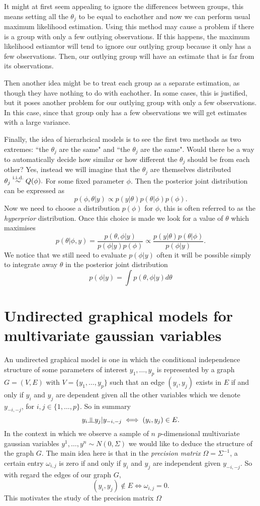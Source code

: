 \documentclass{scrartcl}
\newcommand{\iid}{\stackrel{\textmd{i.i.d.}}{\sim}}
\newcommand{\inv}{^{-1}}
\newcommand{\indep}{\rotatebox[origin=c]{90}{$\models$}}
\begin{document}
It might at first seem appealing to ignore the differences between groups, this
means setting all the $\theta_j$ to be equal to eachother and now we can
perform usual maximum likelihood estimation. Using this method may cause a
problem if there is a group with only a few outlying observations. If this
happens, the maximum likelihood estiamtor will tend to ignore our outlying
group because it only has a few observations. Then, our outlying group will
have an estimate that is far from its observations.

Then another idea might be to treat each group as a separate estimation, as
though they have nothing to do with eachother. In some cases, this is
justified, but it poses another problem for our outlying group with only a few
observations. In this case, since that group only has a few observations we
will get estimates with a large variance.

Finally, the idea of hierarhcical models is to see the first two methods as two
extremes: ``the $\theta_j$ are the same" and ``the $\theta_j$ are the same".
Would there be a way to automatically decide how similar or how different the $\theta_j$ should be from each other?
Yes, instead we will imagine that the $\theta_j$ are themselves distributed
$\theta_j \iid Q(\phi).$ For some fixed parameter $\phi.$ Then the posterior
joint distribution can be expressed as
\[p(\phi, \theta | y) \propto p(y | \theta) p(\theta | \phi) p(\phi).\]
Now we need to choose a distribution $p(\phi)$ for $\phi$, this is often
referred to as the \emph{hyperprior} distribution. Once this choice is made we
look for a value of $\theta$ which maximises \[p(\theta | \phi, y) =
	\frac{p(\theta, \phi | y)}{p(\phi | y) p(\phi)} \propto \frac{p(y | \theta)
		p(\theta | \phi)}{p(\phi | y)}.\]
We notice that we still need to evaluate $p(\phi | y)$ often it will be
possible simply to integrate away $\theta$ in the posterior joint distribution
\[p(\phi | y) = \int p(\theta, \phi | y) d\theta\]

\section{Undirected graphical models for multivariate gaussian
  variables}\label{sect:graphs}
An undirected graphical model is one in which the conditional independence
structure of some parameters of interest $y_1, \dots, y_p$ is represented by a
graph $G=(V, E)$ with $V = \{y_1, \dots, y_p\}$ such that an edge $(y_i, y_j)$
exists in $E$ if and only if $y_i$ and $y_j$ are dependent given all the other
variables which we denote $y_{-i, -j}$, for $i,j \in \{1,\dots,p\}.$ So in summary \[y_i \indep y_j |
	y_{-i,-j} \iff (y_i, y_j) \in E.\] In the context in which we observe a sample
of $n$ $p$-dimensional multivariate gaussian variables $y^1, \dots, y^n \sim
	N(0, \Sigma)$ we would like to deduce the structure of the graph $G$.
The main idea here is that in the \emph{precision matrix} $\Omega =
	\Sigma\inv$, a certain entry $\omega_{i,j}$ is zero if and only if $y_i$ and $y_j$ are
independent given $y_{-i,-j}$. So with regard the edges of our graph $G$,
\[(y_i, y_j) \notin E \iff \omega_{i,j} = 0.\]
This motivates the study of the precision matrix $\Omega$
\end{document}
